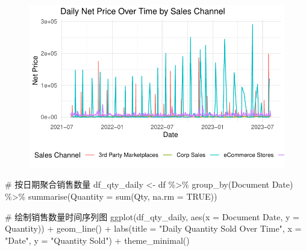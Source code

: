 \documentclass[
  letterpaper,
  DIV=11,
  numbers=noendperiod]{scrartcl}
\newenvironment{Shaded}{\begin{snugshade}}{\end{snugshade}}
\newcommand{\AttributeTok}[1]{\textcolor[rgb]{0.40,0.45,0.13}{#1}}
\newcommand{\CommentTok}[1]{\textcolor[rgb]{0.37,0.37,0.37}{#1}}
\newcommand{\ConstantTok}[1]{\textcolor[rgb]{0.56,0.35,0.01}{#1}}
\newcommand{\FunctionTok}[1]{\textcolor[rgb]{0.28,0.35,0.67}{#1}}
\newcommand{\NormalTok}[1]{\textcolor[rgb]{0.00,0.23,0.31}{#1}}
\newcommand{\OtherTok}[1]{\textcolor[rgb]{0.00,0.23,0.31}{#1}}
\newcommand{\SpecialCharTok}[1]{\textcolor[rgb]{0.37,0.37,0.37}{#1}}
\newcommand{\StringTok}[1]{\textcolor[rgb]{0.13,0.47,0.30}{#1}}
\begin{document}
\begin{figure}[H]

{\centering \includegraphics{Time-Serise-EDA_files/figure-pdf/unnamed-chunk-2-3.pdf}

}

\end{figure}

\begin{Shaded}
\begin{Highlighting}[]
\CommentTok{\# 按日期聚合销售数量}
\NormalTok{df\_qty\_daily }\OtherTok{\textless{}{-}}\NormalTok{ df }\SpecialCharTok{\%\textgreater{}\%}
  \FunctionTok{group\_by}\NormalTok{(}\StringTok{\textasciigrave{}}\AttributeTok{Document Date}\StringTok{\textasciigrave{}}\NormalTok{) }\SpecialCharTok{\%\textgreater{}\%}
  \FunctionTok{summarise}\NormalTok{(}\AttributeTok{Quantity =} \FunctionTok{sum}\NormalTok{(Qty, }\AttributeTok{na.rm =} \ConstantTok{TRUE}\NormalTok{))}

\CommentTok{\# 绘制销售数量时间序列图}
\FunctionTok{ggplot}\NormalTok{(df\_qty\_daily, }\FunctionTok{aes}\NormalTok{(}\AttributeTok{x =} \StringTok{\textasciigrave{}}\AttributeTok{Document Date}\StringTok{\textasciigrave{}}\NormalTok{, }\AttributeTok{y =}\NormalTok{ Quantity)) }\SpecialCharTok{+}
  \FunctionTok{geom\_line}\NormalTok{() }\SpecialCharTok{+}
  \FunctionTok{labs}\NormalTok{(}\AttributeTok{title =} \StringTok{"Daily Quantity Sold Over Time"}\NormalTok{,}
       \AttributeTok{x =} \StringTok{"Date"}\NormalTok{, }\AttributeTok{y =} \StringTok{"Quantity Sold"}\NormalTok{) }\SpecialCharTok{+}
  \FunctionTok{theme\_minimal}\NormalTok{()}
\end{Highlighting}
\end{Shaded}
\end{document}
